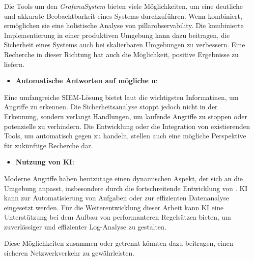 Die Tools um den \textit{\gls{GrafanaSystem}} bieten viele Möglichkeiten, um eine deutliche und akkurate Beobachtbarkeit eines Systems durchzuführen. Wenn kombiniert, ermöglichen sie eine holistische Analyse von \gls{pillarobservability}. Die kombinierte Implementierung in einer produktiven Umgebung kann dazu beitragen, die Sicherheit eines Systems auch bei skalierbaren Umgebungen zu verbessern. Eine Recherche in dieser Richtung hat auch die Möglichkeit, positive Ergebnisse zu liefern.


\begin{itemize}[noitemsep]
    \item \textbf{Automatische Antworten auf mögliche n}:
\end{itemize}

Eine umfangreiche \gls{SIEM}-Lösung bietet laut \cite{Mohammed_NOC} die wichtigsten Informatinen, um Angriffe zu erkennen. Die Sicherheitsanalyse stoppt jedoch nicht in der Erkennung, sondern verlangt Handlungen, um laufende Angriffe zu stoppen oder potenzielle zu verhindern. Die Entwicklung oder die Integration von existierenden Tools, um automatisch gegen  zu handeln, stellen auch eine mögliche Perspektive für zukünftige Recherche dar.

\begin{itemize}[noitemsep]
    \item \textbf{Nutzung von \gls{KI}}:
\end{itemize}

Moderne Angriffe haben heutzutage einen dynamischen Aspekt, der sich an die Umgebung anpasst, insbesondere durch die fortschreitende Entwicklung von  \citep{Guembe_AIHACKER}. \gls{KI} kann zur Automatisierung von Aufgaben oder zur effizienten Datenanalyse eingesetzt werden. Für die Weiterentwicklung dieser Arbeit kann \gls{KI} eine Unterstützung bei dem Aufbau von performanteren Regelsätzen bieten, um zuverlässiger und effizienter Log-Analyse zu gestalten.

Diese Möglichkeiten zusammen oder getrennt könnten dazu beitragen, einen sicheren Netzwerkverkehr zu gewährleisten.
